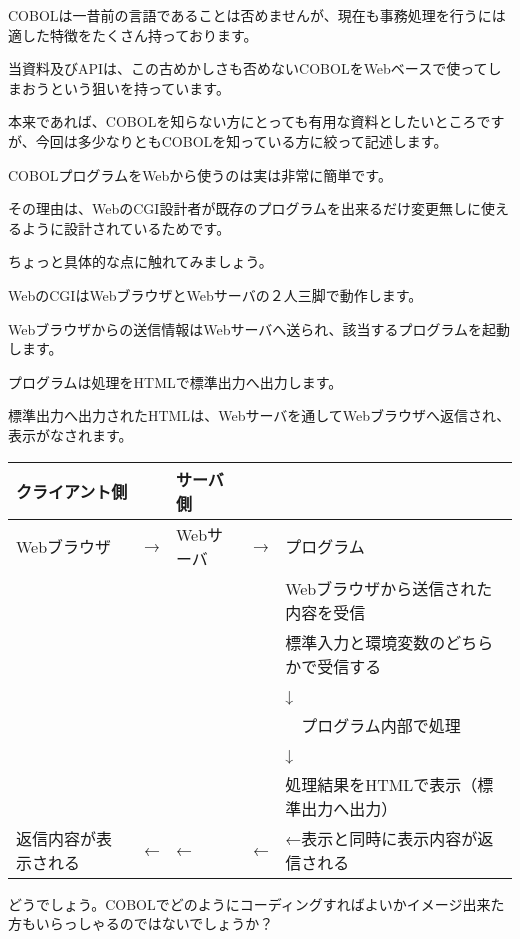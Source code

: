 
COBOLは一昔前の言語であることは否めませんが、現在も事務処理を行うには適した特徴をたくさん持っております。

当資料及びAPIは、この古めかしさも否めないCOBOLをWebベースで使ってしまおうという狙いを持っています。

本来であれば、COBOLを知らない方にとっても有用な資料としたいところですが、今回は多少なりともCOBOLを知っている方に絞って記述します。

COBOLプログラムをWebから使うのは実は非常に簡単です。

その理由は、WebのCGI設計者が既存のプログラムを出来るだけ変更無しに使えるように設計されているためです。

ちょっと具体的な点に触れてみましょう。

WebのCGIはWebブラウザとWebサーバの２人三脚で動作します。

Webブラウザからの送信情報はWebサーバへ送られ、該当するプログラムを起動します。

\par

プログラムは処理をHTMLで標準出力へ出力します。

標準出力へ出力されたHTMLは、Webサーバを通してWebブラウザへ返信され、表示がなされます。

\vspace{1em}

\begin{tabular}{|lllll|}
\hline
クライアント側 & & サーバ側 & & \\
\hline
Webブラウザ & → & Webサーバ & → & プログラム \\
            &    &           &    &  Webブラウザから送信された内容を受信 \\
            &    &           &    &  標準入力と環境変数のどちらかで受信する\\
            &    &           &    &       ↓ \\
            &    &           &    & 　プログラム内部で処理\\
            &    &           &    &       ↓ \\
            &    &           &    &  処理結果をHTMLで表示（標準出力へ出力）\\
返信内容が表示される& ← &  ←       &←  &  ←表示と同時に表示内容が返信される \\
\hline
\end{tabular}

\vspace{1em}

どうでしょう。COBOLでどのようにコーディングすればよいかイメージ出来た方もいらっしゃるのではないでしょうか？


